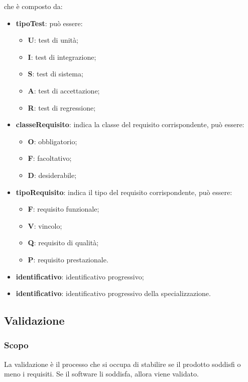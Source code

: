 	che è composto da:
	\begin{itemize}
	    \item \textbf{tipoTest}: può essere:
	    \begin{itemize}
	        \item \textbf{U}: test di unità;
	        \item \textbf{I}: test di integrazione;
	        \item \textbf{S}: test di sistema;
	        \item \textbf{A}: test di accettazione;
	        \item \textbf{R}: test di regressione;
	    \end{itemize}
	    \item \textbf{classeRequisito}: indica la classe del requisito corrispondente, può essere:
	        \begin{itemize}
	            \item \textbf{O}: obbligatorio;
	            \item \textbf{F}: facoltativo;
	            \item \textbf{D}: desiderabile;
	        \end{itemize}
	   \item \textbf{tipoRequisito}: indica il tipo del requisito corrispondente, può essere:
	        \begin{itemize}
	            \item \textbf{F}: requisito funzionale;
	            \item \textbf{V}: vincolo;
	            \item \textbf{Q}: requisito di qualità;
	            \item \textbf{P}: requisito prestazionale. 
	        \end{itemize}
	  \item \textbf{identificativo}: identificativo progressivo;
	  \item \textbf{identificativo}: identificativo progressivo della specializzazione.
	\end{itemize}
	\subsection{Validazione}
	\subsubsection{Scopo}
	La validazione è il processo che si occupa di stabilire se il prodotto soddisfi o meno i requisiti. Se il software li soddisfa, allora viene validato.
